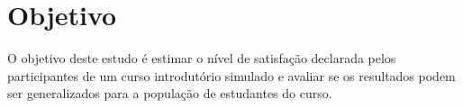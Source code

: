 \section{Objetivo}
O objetivo deste estudo é estimar o nível de satisfação declarada pelos participantes de um curso introdutório simulado e avaliar se os resultados podem ser generalizados para a população de estudantes do curso.
